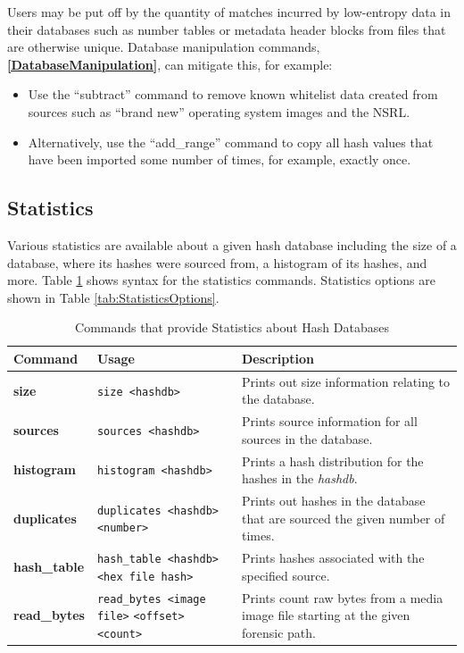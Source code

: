 \documentclass[11pt,fleqn]{article} %
\begin{document}
\begin{itemize}
Users may be put off by the quantity of matches incurred by low-entropy data in their databases such as number tables or metadata header blocks from files that are otherwise unique. Database manipulation commands,
\textbf{\autoref{DatabaseManipulation}}, can mitigate this, for example:
\begin{itemize}
\item Use the ``subtract'' command to remove known whitelist data created from sources such as ``brand new'' operating system images and the NSRL.
\item Alternatively, use the ``add\_range'' command to copy all hash values that have been imported some number of times, for example, exactly once.
\end{itemize}

\end{itemize}

\subsection{Statistics}
Various statistics are available about a given hash database including the size of a database, where its hashes were sourced from, a histogram of its hashes, and more.
Table \ref{tab:statistics} shows syntax for the statistics commands.
Statistics options are shown in Table \ref{tab:StatisticsOptions}.
\begin{table}[!ht]
\centering
\caption{Commands that provide Statistics about Hash Databases}
\label{tab:statistics}
\begin{tabular}{|p{3.5 cm}|p{6 cm}|p{4 cm}|}
\hline \hline
\textbf{Command} & \textbf{Usage} & \textbf{Description} \\
\hline
\textbf{size} & \verb+size <hashdb>+ & Prints out size information relating to the database.\\
\hline
\textbf{sources} & \verb+sources <hashdb>+ & Prints source information for all sources in the database.\\
\hline
\textbf{histogram} & \verb+histogram <hashdb>+ & Prints a hash distribution for the hashes in the \textit{hashdb}.\\
\hline
\textbf{duplicates} & \verb+duplicates <hashdb> <number>+ &  Prints out hashes in the database that are sourced the given number of times.\\
\hline
\textbf{hash\_table} & \verb+hash_table <hashdb>+ \verb+<hex file hash>+ &  Prints hashes associated with the specified source.\\
\hline
\textbf{read\_bytes} & \verb+read_bytes <image file>+ \verb+<offset> <count>+ &  Prints count raw bytes from a media image file starting at the given forensic path.\\
\hline
\end{tabular}
\end{table}
\end{document}
